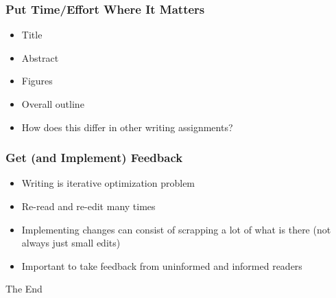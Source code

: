 \documentclass[14pt,handout]{beamer}
\begin{document}
\begin{frame}
\frametitle{Put Time/Effort Where It Matters}
\begin{itemize}
	\item<+-> Title
	\item<+-> Abstract 
	\item<+-> Figures
	\item<+-> Overall outline
	\item<+-> How does this differ in other writing assignments?
\end{itemize}
\end{frame}

\begin{frame}
\frametitle{Get (and Implement) Feedback}
\begin{itemize}
	\item<+-> Writing is iterative optimization problem
	\item<+-> Re-read and re-edit many times
	\item<+-> Implementing changes can consist of scrapping a lot of what is there (not always just small edits)
	\item<+-> Important to take feedback from uninformed and informed readers
\end{itemize}
\end{frame}

\begin{frame}
\Huge{\centerline{The End}}
\end{frame}

\end{document}
